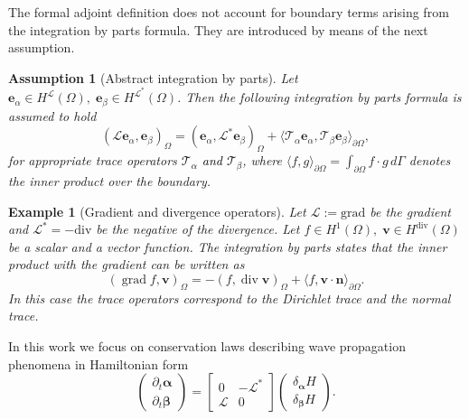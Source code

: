 \documentclass[11pt,a4paper]{article}
\DeclareMathOperator*{\grad}{grad}
\renewcommand{\div}{\operatorname{div}}
\newcommand{\innerproduct}[3][\Omega]{(#2, #3)_{#1}}
\newcommand{\boundary}[3][\partial\Omega]{\langle #2, #3\rangle_{#1}}
\newtheorem{assumption}{Assumption}
\newtheorem{example}{Example}
\newcommand{\revone}[1]{{\textcolor{black}{#1}}}
\begin{document}
The formal adjoint definition does not account for boundary terms arising from the integration by parts formula. They are introduced by means of the next assumption. 
\begin{assumption}[Abstract integration by parts]
    Let $\bm{e}_\alpha \in {H}^{\mathcal{L}}(\Omega), \; \bm{e}_\beta \in {H}^{\mathcal{L}^*}(\Omega)$. Then the following integration by parts formula is assumed to hold
    \begin{equation}\label{eq:abstract_intbyparts}
        \innerproduct{\mathcal{L}\bm{e}_\alpha}{\bm{e}_\beta} = \innerproduct{\bm{e}_\alpha}{\mathcal{L}^*\bm{e}_\beta} + \boundary{\mathcal{T}_{\alpha}\bm{e}_\alpha}{\mathcal{T}_{\beta}\bm{e}_\beta},
    \end{equation}  
for appropriate trace operators \revone{$\mathcal{T}_\alpha$ and $\mathcal{T_\beta}$}, where $\boundary{f}{g} = \int_{\partial\Omega} f \cdot g \, d\Gamma$ denotes the inner product over the boundary.
\end{assumption}
\begin{example}[Gradient and divergence operators]
    Let $\mathcal{L}:= \mathrm{grad}$ be the gradient and $\mathcal{L}^* = -\mathrm{div}$ be the negative of the divergence. Let $f \in H^1(\Omega), \; \bm{v} \in H^{\mathrm{div}}(\Omega)$ be a scalar and a vector function. The integration by parts states that the inner product with the gradient can be written as
    \begin{equation}
        \innerproduct{\grad f}{\bm{v}} = - \innerproduct{f}{\div\bm{v}} + \boundary{f}{\bm{v} \cdot \bm{n}}.
    \end{equation}
    In this case the trace operators correspond to the Dirichlet trace and the normal trace.
\end{example}
In this work we focus on conservation laws describing wave propagation phenomena in Hamiltonian form
\begin{equation}
\begin{pmatrix}
    \partial_t{\bm{\alpha}} \\
    \partial_t{\bm{\beta}}
\end{pmatrix} = 
\begin{bmatrix}
    0 & -\mathcal{L}^* \\
    \mathcal{L} & 0
\end{bmatrix}
\begin{pmatrix}
    \delta_{\bm{\alpha}} H\\
    \delta_{\bm{\beta}} H
\end{pmatrix}.
\label{eq:energy_co-energy-system}
\end{equation}
\end{document}
